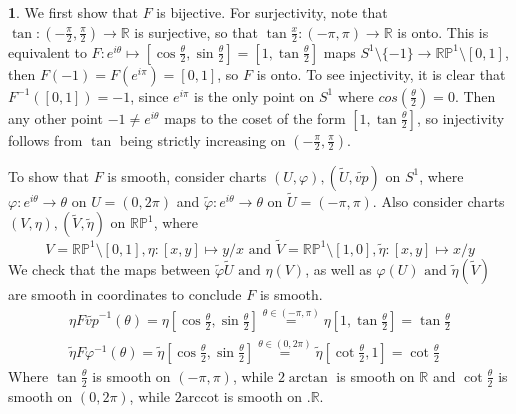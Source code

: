 \documentclass[10.5pt]{article}
\theoremstyle{definition}
\newtheorem{pb}{}
\newcommand{\set}[1]{\{#1\}}
\newcommand{\tand}{\text{ and }}
\newcommand{\vp}{\varphi}
\begin{document}
    \begin{pb}
        We first show that \(F\) is bijective. For surjectivity, note that \(\tan: (-\frac{\pi}{2},\frac{\pi}{2}) \to \mathbb{R}\) is surjective, so that
        \(\tan \frac{x}{2}: (-\pi,\pi) \to \mathbb{R}\) is onto. This is equivalent to \(F: e^{i\theta} \mapsto [\cos \frac{\theta}{2}, \sin \frac{\theta}{2}] = [1,\tan \frac{\theta}{2}]\)
        maps \(S^1 \setminus \set{-1} \to \mathbb{RP}^1 \setminus [0,1]\), then \(F(-1) = F(e^{i\pi}) = [0,1]\), so \(F\) is onto. To see injectivity, it is clear that
        \(F^{-1}([0,1]) = -1\), since \(e^{i\pi}\) is the only point on \(S^1\) where \(cos(\frac{\theta}{2}) = 0\). Then any other point \(-1 \neq e^{i\theta}\) maps to the coset of the form
        \([1,\tan \frac{\theta}{2}]\), so injectivity follows from \(\tan\) being strictly increasing on \((-\frac{\pi}{2}, \frac{\pi}{2})\).

        To show that \(F\) is smooth, consider charts \((U,\vp), (\tilde{U},\tilde{vp})\) on \(S^1\), where \(\vp: e^{i\theta} \to \theta\) on \(U = (0,2\pi)\) and 
        \(\tilde{\vp}: e^{i\theta} \to \theta\) on
        \(\tilde{U} = (-\pi,\pi)\). Also consider charts \((V,\eta), (\tilde{V},\tilde{\eta})\) on \(\mathbb{RP}^1\), where 
        \[V = \mathbb{RP}^1 \setminus [0,1], \eta: [x,y] \mapsto y/x \tand \tilde{V} = \mathbb{RP}^1 \setminus [1,0], \tilde{\eta}: [x,y] \mapsto x/y\]
        We check that the maps between \(\tilde{\vp}\tilde{U} \tand \eta(V)\), as well as \(\vp(U) \tand \tilde{\eta}(\tilde{V})\) are smooth in coordinates to conclude \(F\) is smooth.
        \begin{align*}
            \eta F \tilde{vp}^{-1} (\theta) = \eta [\cos \frac{\theta}{2}, \sin \frac{\theta}{2}] \overset{\theta \in (-\pi,\pi)}{=} \eta [1, \tan \frac{\theta}{2}] = \tan \frac{\theta}{2} \\
            \tilde{\eta} F \vp^{-1} (\theta) = \tilde{\eta} [\cos \frac{\theta}{2}, \sin \frac{\theta}{2}] \overset{\theta \in (0,2\pi)}{=} \tilde{\eta} [\cot \frac{\theta}{2},1] = \cot \frac{\theta}{2}
        \end{align*}
        Where \(\tan \frac{\theta}{2}\) is smooth on \((-\pi,\pi)\), while \(2\arctan\) is smooth on \(\mathbb{R}\) and \(\cot \frac{\theta}{2}\) is smooth on \((0,2\pi)\), while \(2\text{arccot}\) is smooth on .\(\mathbb{R}\).
    \end{pb}
\end{document}
